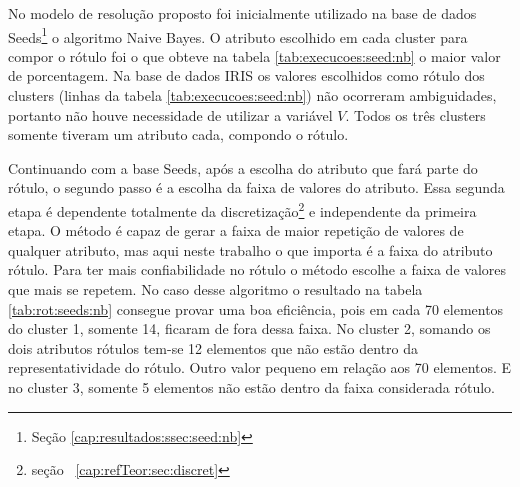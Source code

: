 No modelo de resolução proposto foi inicialmente utilizado na base de dados Seeds\footnote{Seção \ref{cap:resultados:ssec:seed:nb}} o algoritmo Naive Bayes. O atributo escolhido em cada cluster para compor o rótulo foi o que obteve  na tabela \ref{tab:execucoes:seed:nb} o maior valor de porcentagem. Na base de dados IRIS os valores escolhidos como rótulo dos clusters (linhas da tabela \ref{tab:execucoes:seed:nb}) não ocorreram ambiguidades, portanto não houve necessidade de utilizar a variável ${V}$. Todos os três clusters somente tiveram um atributo cada, compondo o rótulo.

Continuando com a base Seeds, após a escolha do atributo que fará parte do rótulo, o segundo passo é a escolha da faixa de valores do atributo. Essa segunda etapa é dependente totalmente da discretização\footnote{seção ~\ref{cap:refTeor:sec:discret}} e independente da primeira etapa. O método é capaz de gerar a faixa de maior repetição de valores de qualquer atributo, mas aqui neste trabalho o que importa é a faixa do atributo rótulo. Para ter mais  confiabilidade  no rótulo o método escolhe a faixa de valores que mais se repetem. No caso desse algoritmo o resultado na tabela \ref{tab:rot:seeds:nb} consegue provar uma boa eficiência, pois em cada 70 elementos do cluster 1, somente 14, ficaram de fora dessa faixa. No cluster 2, somando os dois atributos rótulos tem-se 12 elementos que não estão dentro da representatividade do rótulo. Outro valor pequeno em relação aos 70 elementos. E no cluster 3, somente 5 elementos não estão dentro da faixa considerada rótulo.


